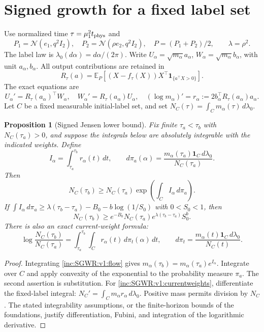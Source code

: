 \documentclass[11pt]{article}
\numberwithin{equation}{section}
\newtheorem{proposition}[theorem]{Proposition}
\theoremstyle{remark}\newtheorem{remark}[theorem]{Remark}
\newcommand{\E}{\mathbb E}
\newcommand{\dd}{\,d}
\newcommand{\1}{\mathbf1}
\begin{document}
\section{Signed growth for a fixed label set}
Use normalized time $\tau=\mu_1^2t_{\rm phys}$ and
\[
 P_1=\mathcal N(e_1,q^2I_2),\quad
 P_2=\mathcal N(\rho e_2,q^2I_2),\quad P=(P_1+P_2)/2,
 \qquad \lambda=\rho^2.
\]
The label law is $\lambda_0(d\alpha)=d\alpha/(2\pi)$.
Write $U_\alpha=\sqrt{m_\alpha}a_\alpha$,
$W_\alpha=\sqrt{m_\alpha}b_\alpha$, with unit $a_\alpha,b_\alpha$.
All output contributions are retained in
\[
 R_\tau(a)=\E_P[(X-f_\tau(X))X^\top\1_{\{a^\top X>0\}}].
\]
The exact equations are
\begin{equation}\label{inc:SGWR:v1:flow}
 U_\alpha'=R_\tau(a_\alpha)^\top W_\alpha,
 \quad W_\alpha'=R_\tau(a_\alpha)U_\alpha,
 \quad (\log m_\alpha)'=r_\alpha:=2b_\alpha^\top R_\tau(a_\alpha)a_\alpha.
\end{equation}
Let $C$ be a fixed measurable initial-label set, and set
$N_C(\tau)=\int_Cm_\alpha(\tau)\dd\lambda_0$.

\begin{proposition}[Signed Jensen lower bound]\label{inc:SGWR:v1:jensen}
Fix finite $\tau_a<\tau_b$ with $N_C(\tau_a)>0$, and suppose the integrals
below are absolutely integrable with the indicated weights. Define
\[
 I_\alpha=\int_{\tau_a}^{\tau_b}r_\alpha(t)\dd t,
 \qquad d\pi_a(\alpha)=\frac{m_\alpha(\tau_a)\1_C\dd\lambda_0}{N_C(\tau_a)}.
\]
Then
\begin{equation}\label{inc:SGWR:v1:signedjensen}
 \boxed{N_C(\tau_b)\ge N_C(\tau_a)
                  \exp\!\left(\int_C I_\alpha\dd\pi_a\right).}
\end{equation}
If $\int I_\alpha\dd\pi_a\ge
\lambda(\tau_b-\tau_a)-B_0-b\log(1/S_0)$ with $0<S_0<1$, then
\[
 N_C(\tau_b)\ge e^{-B_0}N_C(\tau_a)
                 e^{\lambda(\tau_b-\tau_a)}S_0^b.
\]
There is also an exact current-weight formula:
\begin{equation}\label{inc:SGWR:v1:currentweights}
 \log\frac{N_C(\tau_b)}{N_C(\tau_a)}
 =\int_{\tau_a}^{\tau_b}\int_C r_\alpha(t)\dd\pi_t(\alpha)\dd t,
 \qquad d\pi_t=\frac{m_\alpha(t)\1_C\dd\lambda_0}{N_C(t)}.
\end{equation}
\end{proposition}
\begin{proof}
Integrating \eqref{inc:SGWR:v1:flow} gives
$m_\alpha(\tau_b)=m_\alpha(\tau_a)e^{I_\alpha}$. Integrate over $C$ and
apply convexity of the exponential to the probability measure $\pi_a$.
The second assertion is substitution. For \eqref{inc:SGWR:v1:currentweights},
differentiate the fixed-label integral: $N_C'=\int_Cm_\alpha r_\alpha
\dd\lambda_0$. Positive mass permits division by $N_C$. The stated
integrability assumptions, or the finite-horizon bounds of the foundations,
justify differentiation, Fubini, and integration of the logarithmic derivative.
\end{proof}
\end{document}
